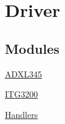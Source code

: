 \hypertarget{group___driver}{
\section{Driver}
\label{group___driver}
}
\subsection*{Modules}
\begin{DoxyCompactItemize}
\item 
\hyperlink{group___a_d_x_l345}{ADXL345}
\item 
\hyperlink{group___i_t_g3200}{ITG3200}
\item 
\hyperlink{group___interrupt}{Handlers}
\end{DoxyCompactItemize}
